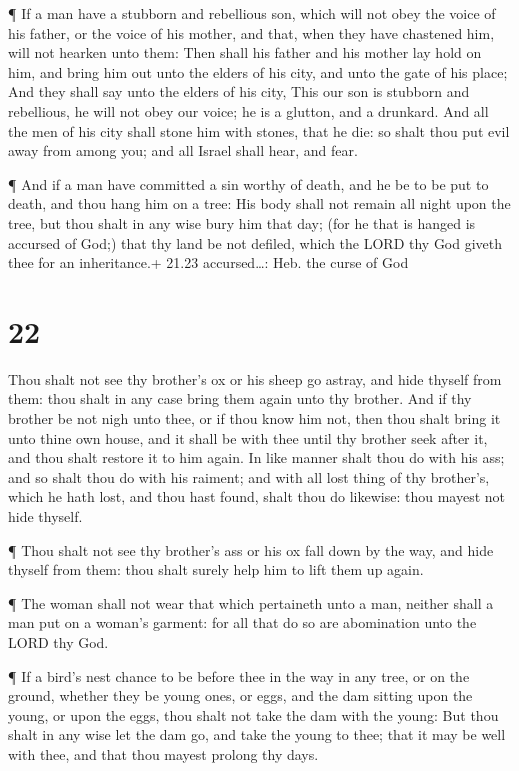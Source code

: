  ¶ If a man have a stubborn and rebellious son, which will
not obey the voice of his father, or the voice of his mother, and that,
when they have chastened him, will not hearken unto them: 
Then shall his father and his mother lay hold on him, and bring him out
unto the elders of his city, and unto the gate of his place;
 And they shall say unto the elders of his city, This our
son is stubborn and rebellious, he will not obey our voice; he is a
glutton, and a drunkard.  And all the men of his city shall
stone him with stones, that he die: so shalt thou put evil away from
among you; and all Israel shall hear, and fear.

 ¶ And if a man have committed a sin worthy of death, and
he be to be put to death, and thou hang him on a tree:  His
body shall not remain all night upon the tree, but thou shalt in any
wise bury him that day; (for he that is hanged is accursed of God;) that
thy land be not defiled, which the LORD thy God giveth thee for an
inheritance.+ 21.23 accursed\ldots: Heb. the curse of God

\hypertarget{section-21}{%
\section{22}\label{section-21}}

 Thou shalt not see thy brother's ox or his sheep go astray,
and hide thyself from them: thou shalt in any case bring them again unto
thy brother.  And if thy brother be not nigh unto thee, or
if thou know him not, then thou shalt bring it unto thine own house, and
it shall be with thee until thy brother seek after it, and thou shalt
restore it to him again.  In like manner shalt thou do with
his ass; and so shalt thou do with his raiment; and with all lost thing
of thy brother's, which he hath lost, and thou hast found, shalt thou do
likewise: thou mayest not hide thyself.

 ¶ Thou shalt not see thy brother's ass or his ox fall down
by the way, and hide thyself from them: thou shalt surely help him to
lift them up again.

 ¶ The woman shall not wear that which pertaineth unto a
man, neither shall a man put on a woman's garment: for all that do so
are abomination unto the LORD thy God.

 ¶ If a bird's nest chance to be before thee in the way in
any tree, or on the ground, whether they be young ones, or eggs, and the
dam sitting upon the young, or upon the eggs, thou shalt not take the
dam with the young:  But thou shalt in any wise let the dam
go, and take the young to thee; that it may be well with thee, and that
thou mayest prolong thy days.

